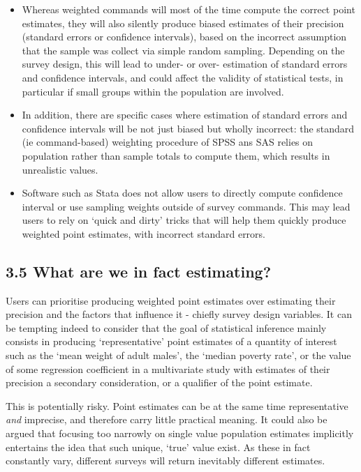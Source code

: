 \documentclass[
  14,
  a4paper,
  DIV=11,
  numbers=noendperiod]{scrartcl}
\begin{document}
\begin{itemize}
\item
  Whereas weighted commands will most of the time compute the correct
  point estimates, they will also silently produce biased estimates of
  their precision (standard errors or confidence intervals), based on
  the incorrect assumption that the sample was collect via simple random
  sampling. Depending on the survey design, this will lead to under- or
  over- estimation of standard errors and confidence intervals, and
  could affect the validity of statistical tests, in particular if small
  groups within the population are involved.
\item
  In addition, there are specific cases where estimation of standard
  errors and confidence intervals will be not just biased but wholly
  incorrect: the standard (ie command-based) weighting procedure of SPSS
  ans SAS relies on population rather than sample totals to compute
  them, which results in unrealistic values.
\item
  Software such as Stata does not allow users to directly compute
  confidence interval or use sampling weights outside of survey
  commands. This may lead users to rely on `quick and dirty' tricks that
  will help them quickly produce weighted point estimates, with
  incorrect standard errors.
\end{itemize}

\hypertarget{what-are-we-in-fact-estimating}{%
\subsection{3.5 What are we in fact
estimating?}\label{what-are-we-in-fact-estimating}}

Users can prioritise producing weighted point estimates over estimating
their precision and the factors that influence it - chiefly survey
design variables. It can be tempting indeed to consider that the goal of
statistical inference mainly consists in producing `representative'
point estimates of a quantity of interest such as the `mean weight of
adult males', the `median poverty rate', or the value of some regression
coefficient in a multivariate study with estimates of their precision a
secondary consideration, or a qualifier of the point estimate.

This is potentially risky. Point estimates can be at the same time
representative \emph{and} imprecise, and therefore carry little
practical meaning. It could also be argued that focusing too narrowly on
single value population estimates implicitly entertains the idea that
such unique, `true' value exist. As these in fact constantly vary,
different surveys will return inevitably different estimates.
\end{document}
